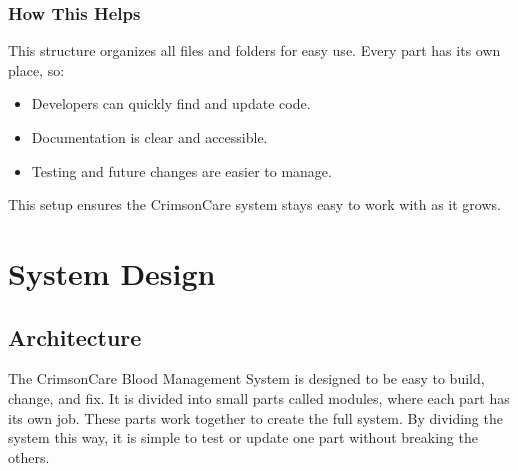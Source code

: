\documentclass[12pt,a4paper]{report}
\begin{document}
\subsection*{How This Helps}
This structure organizes all files and folders for easy use. Every part has its own place, so:
\begin{itemize}
    \item Developers can quickly find and update code.
    \item Documentation is clear and accessible.
    \item Testing and future changes are easier to manage.
\end{itemize}

This setup ensures the CrimsonCare system stays easy to work with as it grows.

\chapter{System Design}
\section{Architecture}
The CrimsonCare Blood Management System is designed to be easy to build, change,
and fix. It is divided into small parts called modules, where each part has its own job.
These parts work together to create the full system. By dividing the system this way,
it is simple to test or update one part without breaking the others.
\end{document}
